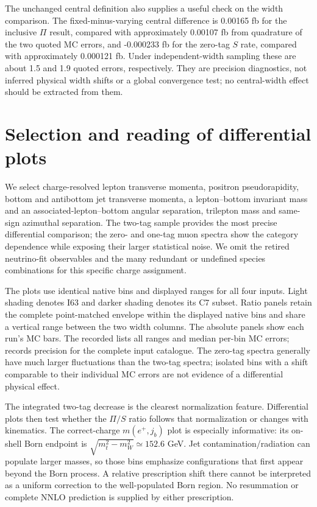 \documentclass[11pt,a4paper]{article}
\newcommand{\code}[1]{\texttt{\detokenize{#1}}}
\begin{document}
The unchanged central definition also supplies a useful check on the width
comparison. The fixed-minus-varying central difference is 0.00165 fb for
the inclusive $\Pi$ result, compared with approximately 0.00107 fb from
quadrature of the two quoted MC errors, and -0.000233 fb for the zero-tag
$S$ rate, compared with approximately 0.000121 fb. Under independent-width
sampling these are about 1.5 and 1.9 quoted errors, respectively. They are
precision diagnostics, not inferred physical width shifts or a global
convergence test; no central-width effect should be extracted from them.

\section{Selection and reading of differential plots}
We select charge-resolved lepton transverse momenta, positron pseudorapidity,
bottom and antibottom jet transverse momenta, a lepton--bottom invariant
mass and an associated-lepton--bottom angular separation, trilepton mass
and same-sign azimuthal separation. The two-tag sample provides the most
precise differential comparison; the zero- and one-tag muon spectra show
the category dependence while exposing their larger statistical noise.
We omit the retired neutrino-fit observables and the many redundant or
undefined species combinations for this specific charge assignment.

The plots use identical native bins and displayed ranges for all four
inputs. Light shading denotes I63 and darker shading denotes its C7
subset. Ratio panels retain the complete point-matched envelope within
the displayed native bins and share a vertical range between the two width
columns. The absolute panels show each run's MC bars. The recorded
\code{figure_manifest.json} lists all ranges and median per-bin MC errors;
\code{histogram_precision.csv} records precision for the complete input
catalogue. The zero-tag spectra generally have much larger fluctuations
than the two-tag spectra; isolated bins with a shift comparable to their
individual MC errors are not evidence of a differential physical effect.

The integrated two-tag decrease is the clearest normalization feature.
Differential plots then test whether the $\Pi/S$ ratio follows that
normalization or changes with kinematics. The correct-charge
$m(e^+,j_b)$ plot is especially informative: its on-shell Born endpoint is
$\sqrt{m_t^2-m_W^2}\simeq152.6$ GeV. Jet contamination/radiation can populate
larger masses, so those bins emphasize configurations that first appear
beyond the Born process. A relative prescription shift there cannot be
interpreted as a uniform correction to the well-populated Born region.
No resummation or complete NNLO prediction is supplied by either
prescription.
\end{document}
